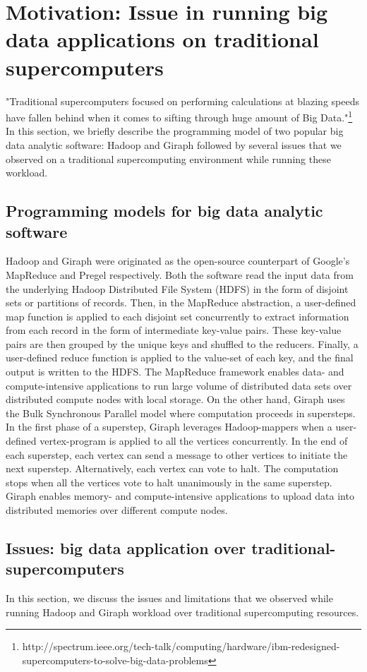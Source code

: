 \documentclass[conference]{IEEEtran}
\begin{document}
\section {Motivation: Issue in running big data applications on traditional supercomputers} \label{Bigdata Softwares on Traditional Supercomputers}
"Traditional supercomputers focused on performing calculations at blazing speeds have fallen behind when it comes to sifting through huge amount of Big Data."\footnote{http://spectrum.ieee.org/tech-talk/computing/hardware/ibm-redesigned-supercomputers-to-solve-big-data-problems}\\
In this section, we briefly describe the programming model of two popular big data analytic software: Hadoop and Giraph followed by several issues that we observed on a traditional supercomputing environment while running these workload.
\subsection {Programming models for big data analytic software}
Hadoop and Giraph were originated as the open-source counterpart of Google's MapReduce and Pregel respectively. Both the software read the input data from the underlying Hadoop Distributed File System (HDFS) in the form of disjoint sets or partitions of records. Then, in the MapReduce abstraction, a user-defined map function is applied to each disjoint set concurrently to extract information from each record in the form of intermediate key-value pairs. These key-value pairs are then grouped by the unique keys and shuffled to the reducers. Finally, a user-defined reduce function is applied to the value-set of each key, and the final output is written to the HDFS. The MapReduce framework enables data- and compute-intensive applications to run large volume of distributed data sets over distributed compute nodes with local storage. On the other hand, Giraph uses the Bulk Synchronous Parallel model where computation proceeds in supersteps. In the first phase of a superstep, Giraph leverages Hadoop-mappers when a user-defined vertex-program is applied to all the vertices concurrently. In the end of each superstep, each vertex can send a message to other vertices to initiate the next superstep. Alternatively, each vertex can vote to halt. The computation stops when all the vertices vote to halt unanimously in the same superstep. Giraph enables memory- and compute-intensive applications to upload data into distributed memories over different compute nodes.
\subsection {Issues: big data application over traditional-supercomputers}
In this section, we discuss the issues and limitations that we observed while running Hadoop and Giraph workload over traditional supercomputing resources. 
\end{document}
